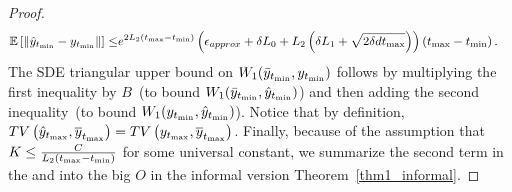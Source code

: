 \begin{proof}
\begin{align*}
        \mathbb{E}\left[ {\left\| \hat{y}_{t_{\textrm{min}}}- y_{t_{\textrm{min}}} \right\|} \right] 
        \leq& e^{2L_2 \left( t_{\textrm{max}} - t_{\textrm{min}} \right)} \left( {\epsilon_{approx}} + \delta L_0 + L_2 \left( \delta L_1 + \sqrt{2\delta d t_{\textrm{max}}} \right) \right)\left( t_{\textrm{max}} - t_{\textrm{min}} \right).
    \end{align*}
    The SDE triangular upper bound on $ W_1(\Bar{y}_{t_{\textrm{min}}}, y_{t_{\textrm{min}}})$ follows by multiplying the first inequality by $B$~(to bound $W_1(\Bar{y}_{t_{\textrm{min}}},\hat{y}_{t_{\textrm{min}}})$) and then adding the second inequality~(to bound $W_1(y_{t_{\textrm{min}}},\hat{y}_{t_{\textrm{min}}})$). Notice that by definition, $TV\left( \hat{y}_{t_{\textrm{max}}}, \overline{y}_{t_{\textrm{max}}} \right) = TV\left( {y}_{t_{\textrm{max}}}, \overline{y}_{t_{\textrm{max}}} \right)$. Finally, because of the assumption that $K \leq \frac{C}{L_2 \left( t_{\textrm{max}} - t_{\textrm{min}} \right)}$ for some universal constant, we summarize the second term in the  and  into the big $O$ in the informal version Theorem~\ref{thm1_informal}.
\end{proof}


